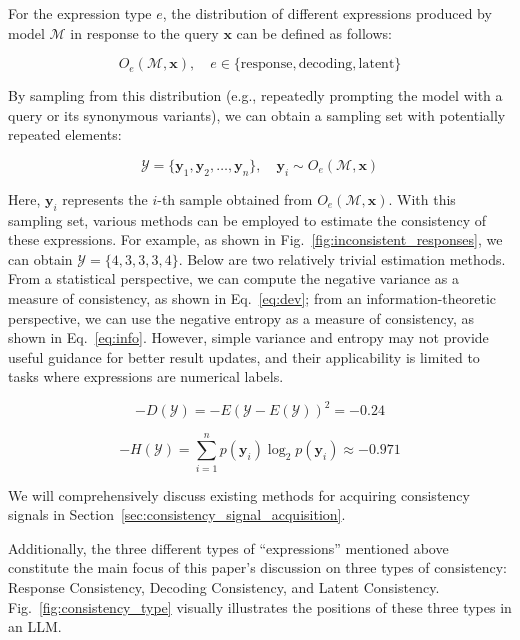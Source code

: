 \documentclass[lettersize,journal]{IEEEtran}
\begin{document}
For the expression type $e$, the distribution of different expressions produced by model $\mathcal{M}$ in response to the query $\boldsymbol{x}$ can be defined as follows:

\begin{equation}
    O_e(\mathcal{M}, \boldsymbol{x}), \quad e \in \{\text{response}, \text{decoding},\text{latent}\}
    \label{eq:observation_distribution}
\end{equation}

By sampling from this distribution (e.g., repeatedly prompting the model with a query or its synonymous variants), we can obtain a sampling set with potentially repeated elements:

\begin{equation}
    \mathcal{Y}= \{ \boldsymbol{y}_1, \boldsymbol{y}_2, \ldots, \boldsymbol{y}_n \}, \quad \boldsymbol{y}_i \sim O_e(\mathcal{M}, \boldsymbol{x})
\end{equation}

Here, $\boldsymbol{y}_i$ represents the $i$-th sample obtained from $O_e(\mathcal{M}, \boldsymbol{x})$. With this sampling set, various methods can be employed to estimate the consistency of these expressions. For example, as shown in Fig.~\ref{fig:inconsistent_responses}, we can obtain $\mathcal{Y}= \{ 4,3,3,3,4 \}$. Below are two relatively trivial estimation methods. From a statistical perspective, we can compute the negative variance as a measure of consistency, as shown in Eq.~\ref{eq:dev}; from an information-theoretic perspective, we can use the negative entropy as a measure of consistency, as shown in Eq.~\ref{eq:info}. However, simple variance and entropy may not provide useful guidance for better result updates, and their applicability is limited to tasks where expressions are numerical labels.

\begin{equation}
    -D(\mathcal{Y})=-E(\mathcal{Y}-E(\mathcal{Y}))^2=-0.24
    \label{eq:dev}
\end{equation}

\begin{equation}
    -H(\mathcal{Y}) = \sum_{i=1}^n p(\boldsymbol{y}_i) \log_2 p(\boldsymbol{y}_i) \approx -0.971
    \label{eq:info}
\end{equation}

We will comprehensively discuss existing methods for acquiring consistency signals in Section~\ref{sec:consistency_signal_acquisition}.

Additionally, the three different types of ``expressions'' mentioned above constitute the main focus of this paper's discussion on three types of consistency: Response Consistency, Decoding Consistency, and Latent Consistency. Fig.~\ref{fig:consistency_type} visually illustrates the positions of these three types in an LLM.
\end{document}
